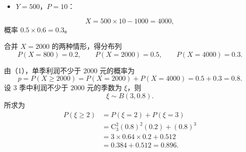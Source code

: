 \begin{answer}
\begin{itemize}
\item $Y=500$，$P=10$：
\end{itemize}
\nopagebreak[4]
\[X=500\times10-1000=4000,\]
概率 $0.5\times0.6=0.3$。

合并 $X=2000$ 的两种情形，得分布列
\nopagebreak[4]
\[P(X=800)=0.2,\qquad P(X=2000)=0.5,\qquad P(X=4000)=0.3.\]


由（1），单季利润不少于 $2000$ 元的概率为
\nopagebreak[4]
\[p=P(X\geqslant2000)=P(X=2000)+P(X=4000)=0.5+0.3=0.8.\]
设 $3$ 季中利润不少于 $2000$ 元的季数为 $\xi$，则
\nopagebreak[4]
\[\xi\sim B(3,0.8).\]
所求为
\nopagebreak[4]
\[\begin{aligned}
P(\xi\geqslant2)
&=P(\xi=2)+P(\xi=3)\\
&=\mathrm C_3^2(0.8)^2(0.2)+(0.8)^3\\
&=3\times0.64\times0.2+0.512\\
&=0.384+0.512=0.896.
\end{aligned}\]



\end{answer}
